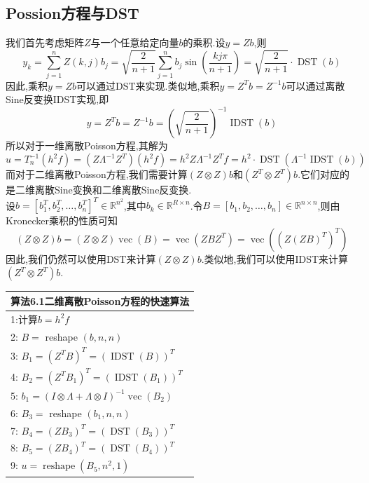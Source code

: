 \documentclass[12pt,a4paper]{article}
\begin{document}
\subsection*{Possion方程与DST}
我们首先考虑矩阵$Z$与一个任意给定向量$b$的乘积.设$y=Zb$,则
$$
y_{k}=\sum_{j=1}^{n} Z(k, j) b_{j}=\sqrt{\frac{2}{n+1}} \sum_{j=1}^{n} b_{j} \sin \left(\frac{k j \pi}{n+1}\right)=\sqrt{\frac{2}{n+1}} \cdot \operatorname{DST}(b)
$$
因此,乘积$y=Zb$可以通过DST来实现.类似地,乘积$y=Z^{T} b=Z^{-1} b$可以通过离散Sine反变换IDST实现,即
$$
y=Z^{T} b=Z^{-1} b=\left(\sqrt{\frac{2}{n+1}}\right)^{-1} \operatorname{IDST}(b)
$$
所以对于一维离散Poisson方程,其解为
$$
u=T_{n}^{-1}\left(h^{2} f\right)=\left(Z \Lambda^{-1} Z^{T}\right)\left(h^{2} f\right)=h^{2} Z \Lambda^{-1} Z^{T} f=h^{2} \cdot \operatorname{DST}\left(\Lambda^{-1} \operatorname{IDST}(b)\right)
$$
而对于二维离散Poisson方程,我们需要计算$(Z \otimes Z) b$和$\left(Z^{T} \otimes Z^{T}\right) b$.它们对应的是二维离散Sine变换和二维离散Sine反变换.\\
设$b=\left[b_{1}^{T}, b_{2}^{T}, \ldots, b_{n}^{T}\right]^{T} \in \mathbb{R}^{n^{2}}$,其中$b_{k} \in \mathbb{R}^{R \times n}$.令$B=\left[b_{1}, b_{2}, \ldots, b_{n}\right] \in\mathbb{R}^{n \times n}$,则由Kronecker乘积的性质可知
$$
(Z \otimes Z) b=(Z \otimes Z) \operatorname{vec}(B)=\operatorname{vec}\left(Z B Z^{T}\right)=\operatorname{vec}\left(\left(Z(Z B)^{T}\right)^{T}\right)
$$
因此,我们仍然可以使用DST来计算$(Z \otimes Z) b$.类似地,我们可以使用IDST来计算$\left(Z^{T} \otimes Z^{T}\right) b$.\\
\begin{tabular}{l}
\hline
{\color{blue}算法6.1}二维离散Poisson方程的快速算法\\
\hline
1:计算$b=h^{2} f$\\
2: $B=$ reshape $(b, n, n)$\\
3: $B_{1}=\left(Z^{T} B\right)^{T}=(\operatorname{IDST}(B))^{T}$\\
4: $B_{2}=\left(Z^{T} B_{1}\right)^{T}=\left(\operatorname{IDST}\left(B_{1}\right)\right)^{T}$\\
5: $b_{1}=(I \otimes \Lambda+\Lambda \otimes I)^{-1} \operatorname{vec}\left(B_{2}\right)$\\
6: $B_{3}=$ reshape $\left(b_{1}, n, n\right)$\\
7: $B_{4}=\left(Z B_{3}\right)^{T}=\left(\operatorname{DST}\left(B_{3}\right)\right)^{T}$\\
8: $B_{5}=\left(Z B_{4}\right)^{T}=\left(\operatorname{DST}\left(B_{4}\right)\right)^{T}$\\
9: $u=\operatorname{reshape}\left(B_{5}, n^{2}, 1\right)$\\
\hline
\end{tabular}
\end{document}
